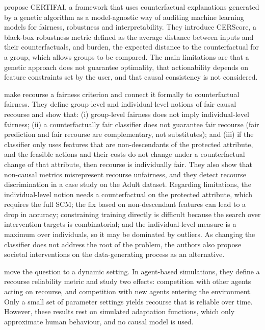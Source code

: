 \citet{sharma2020certifai} propose CERTIFAI, a framework that uses counterfactual explanations generated by
a genetic algorithm as a model-agnostic way of auditing machine learning models for fairness, robustness
and interpretability. They introduce CERScore, a black-box robustness metric defined as the average
distance between inputs and their counterfactuals, and burden, the expected distance to the counterfactual
for a group, which allows groups to be compared. The main limitations are that a genetic approach does
not guarantee optimality, that actionability depends on feature constraints set by the user, and that
causal consistency is not considered.

\citet{vonkugelgen2022fairness} make recourse a fairness criterion and connect it formally to counterfactual
fairness. They define group-level and individual-level notions of fair causal recourse and show that:
(i) group-level fairness does not imply individual-level fairness; (ii) a counterfactually fair classifier
does not guarantee fair recourse (fair prediction and fair recourse are complementary, not substitutes);
and (iii) if the classifier only uses features that are non-descendants of the protected attribute, and the
feasible actions and their costs do not change under a counterfactual change of that attribute, then
recourse is individually fair. They also show that non-causal metrics misrepresent recourse unfairness, and
they detect recourse discrimination in a case study on the Adult dataset. Regarding limitations, the
individual-level notion needs a counterfactual on the protected attribute, which requires the full SCM;
the fix based on non-descendant features can lead to a drop in accuracy; constraining training directly is
difficult because the search over intervention targets is combinatorial; and the individual-level measure
is a maximum over individuals, so it may be dominated by outliers. As changing the classifier does not
address the root of the problem, the authors also propose societal interventions on the data-generating
process as an alternative.

\citet{fonseca2023setting} move the question to a dynamic setting. In agent-based simulations, they define a
recourse reliability metric and study two effects: competition with other agents acting on recourse, and
competition with new agents entering the environment. Only a small set of parameter settings yields recourse
that is reliable over time. However, these results rest on simulated adaptation functions, which only
approximate human behaviour, and no causal model is used.

